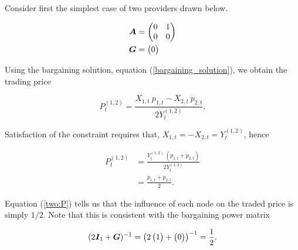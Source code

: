 Consider first the simplest case of two providers drawn below.

\vspace{5mm}
\begin{minipage}{.5\textwidth}
  \resizebox{\textwidth}{!}{}
\end{minipage}
\begin{minipage}{.45\textwidth}
  \begin{equation*}
    \begin{split}
      \bm{A} &= \begin{pmatrix}
        0 & 1 \\
        0 & 0
      \end{pmatrix} \\
      \bm{G} &= \begin{pmatrix}
        0
      \end{pmatrix}
    \end{split}
  \end{equation*}
\end{minipage}
\vspace{5mm}

Using the bargaining solution, equation (\ref{bargaining_solution}), we obtain the trading price

\begin{equation}
  P^{(1, 2)}_t = \frac{X_{1, t} \  p_{1, t} - X_{2, t} \  p_{2, t}}{2 Y^{(1, 2)}_t}.
\end{equation}

Satisfaction of the constraint requires that, $X_{1, t} = - X_{2, t} = Y^{(1, 2)}_t$, hence

\begin{equation} \label{two:P}
  \begin{split}
    P^{(1, 2)}_t &= \frac{Y^{(1, 2)}_t \  \left( p_{1, t} + p_{2, t} \right)}{2  Y^{(1, 2)}_t} \\
    &= \frac{p_{1, t} + p_{2, t}}{2}.
  \end{split}
\end{equation}

Equation (\ref{two:P}) tells us that the influence of each node on the traded price is simply $1 / 2$. Note that this is consistent with the bargaining power matrix

\begin{equation}
  (2 \bm{I}_{1} + \bm{G})^{-1} = \left( 2 \begin{pmatrix} 1 \end{pmatrix} + \begin{pmatrix} 0 \end{pmatrix} \right)^{-1} = \frac{1}{2}.
\end{equation}

